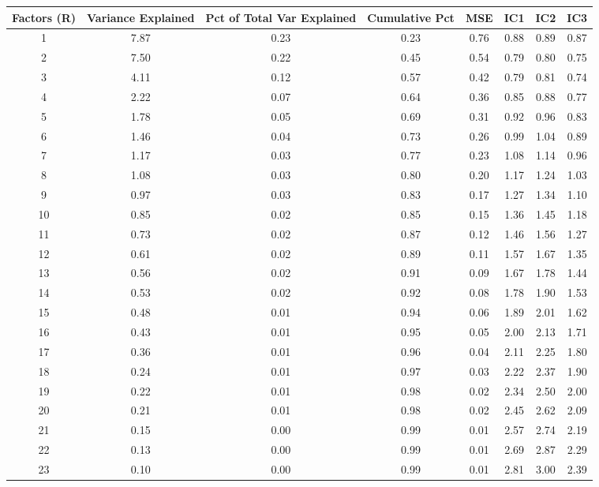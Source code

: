\documentclass[11pt, letterpaper]{article}\usepackage[]{graphicx}\usepackage[]{color}
\begin{document}
\begin{table}[H]
\centering
\begingroup\scriptsize
\begin{tabular}{cccccccc}
  \hline
Factors (R) & Variance Explained & Pct of Total Var Explained & Cumulative Pct & MSE & IC1 & IC2 & IC3 \\ 
  \hline
  1 & 7.87 & 0.23 & 0.23 & 0.76 & 0.88 & 0.89 & 0.87 \\ 
    2 & 7.50 & 0.22 & 0.45 & 0.54 & 0.79 & 0.80 & 0.75 \\ 
    3 & 4.11 & 0.12 & 0.57 & 0.42 & 0.79 & 0.81 & 0.74 \\ 
    4 & 2.22 & 0.07 & 0.64 & 0.36 & 0.85 & 0.88 & 0.77 \\ 
    5 & 1.78 & 0.05 & 0.69 & 0.31 & 0.92 & 0.96 & 0.83 \\ 
    6 & 1.46 & 0.04 & 0.73 & 0.26 & 0.99 & 1.04 & 0.89 \\ 
    7 & 1.17 & 0.03 & 0.77 & 0.23 & 1.08 & 1.14 & 0.96 \\ 
    8 & 1.08 & 0.03 & 0.80 & 0.20 & 1.17 & 1.24 & 1.03 \\ 
    9 & 0.97 & 0.03 & 0.83 & 0.17 & 1.27 & 1.34 & 1.10 \\ 
   10 & 0.85 & 0.02 & 0.85 & 0.15 & 1.36 & 1.45 & 1.18 \\ 
   11 & 0.73 & 0.02 & 0.87 & 0.12 & 1.46 & 1.56 & 1.27 \\ 
   12 & 0.61 & 0.02 & 0.89 & 0.11 & 1.57 & 1.67 & 1.35 \\ 
   13 & 0.56 & 0.02 & 0.91 & 0.09 & 1.67 & 1.78 & 1.44 \\ 
   14 & 0.53 & 0.02 & 0.92 & 0.08 & 1.78 & 1.90 & 1.53 \\ 
   15 & 0.48 & 0.01 & 0.94 & 0.06 & 1.89 & 2.01 & 1.62 \\ 
   16 & 0.43 & 0.01 & 0.95 & 0.05 & 2.00 & 2.13 & 1.71 \\ 
   17 & 0.36 & 0.01 & 0.96 & 0.04 & 2.11 & 2.25 & 1.80 \\ 
   18 & 0.24 & 0.01 & 0.97 & 0.03 & 2.22 & 2.37 & 1.90 \\ 
   19 & 0.22 & 0.01 & 0.98 & 0.02 & 2.34 & 2.50 & 2.00 \\ 
   20 & 0.21 & 0.01 & 0.98 & 0.02 & 2.45 & 2.62 & 2.09 \\ 
   21 & 0.15 & 0.00 & 0.99 & 0.01 & 2.57 & 2.74 & 2.19 \\ 
   22 & 0.13 & 0.00 & 0.99 & 0.01 & 2.69 & 2.87 & 2.29 \\ 
   23 & 0.10 & 0.00 & 0.99 & 0.01 & 2.81 & 3.00 & 2.39 \\ 

\end{tabular}
\end{table}
\end{document}
